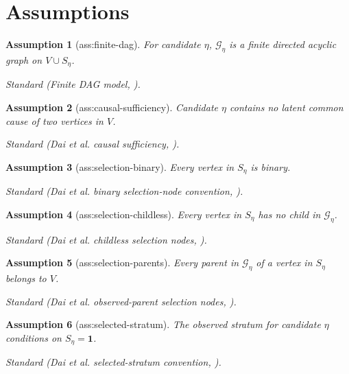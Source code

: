 \documentclass{article}
\newtheorem{assumption}{Assumption}
\begin{document}
\section{Assumptions}

\begin{assumption}[ass:finite-dag]\label{ass:finite-dag}
For candidate \(\eta\), \(\mathcal G_\eta\) is a finite directed acyclic graph on \(V\cup S_\eta\).
\par\smallskip\noindent\emph{Standard} (Finite DAG model, \cite{DaiEtAl2025SelectionIntervention}).
\end{assumption}

\begin{assumption}[ass:causal-sufficiency]\label{ass:causal-sufficiency}
Candidate \(\eta\) contains no latent common cause of two vertices in \(V\).
\par\smallskip\noindent\emph{Standard} (Dai et al. causal sufficiency, \cite{DaiEtAl2025SelectionIntervention}).
\end{assumption}

\begin{assumption}[ass:selection-binary]\label{ass:selection-binary}
Every vertex in \(S_\eta\) is binary.
\par\smallskip\noindent\emph{Standard} (Dai et al. binary selection-node convention, \cite{DaiEtAl2025SelectionIntervention}).
\end{assumption}

\begin{assumption}[ass:selection-childless]\label{ass:selection-childless}
Every vertex in \(S_\eta\) has no child in \(\mathcal G_\eta\).
\par\smallskip\noindent\emph{Standard} (Dai et al. childless selection nodes, \cite{DaiEtAl2025SelectionIntervention}).
\end{assumption}

\begin{assumption}[ass:selection-parents]\label{ass:selection-parents}
Every parent in \(\mathcal G_\eta\) of a vertex in \(S_\eta\) belongs to \(V\).
\par\smallskip\noindent\emph{Standard} (Dai et al. observed-parent selection nodes, \cite{DaiEtAl2025SelectionIntervention}).
\end{assumption}

\begin{assumption}[ass:selected-stratum]\label{ass:selected-stratum}
The observed stratum for candidate \(\eta\) conditions on \(S_\eta=\mathbf 1\).
\par\smallskip\noindent\emph{Standard} (Dai et al. selected-stratum convention, \cite{DaiEtAl2025SelectionIntervention}).
\end{assumption}
\end{document}
